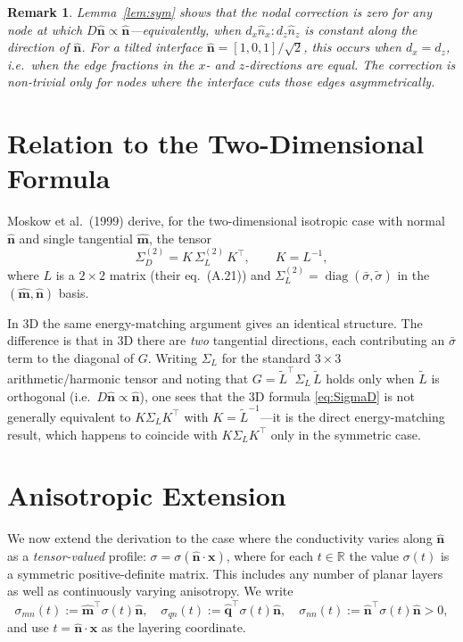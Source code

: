 \documentclass[11pt]{article}
\newtheorem{remark}{Remark}
\newcommand{\nn}{\hat{\bm{n}}}
\newcommand{\mm}{\hat{\bm{m}}}
\newcommand{\qq}{\hat{\bm{q}}}
\newcommand{\tL}{\widetilde{L}}
\newcommand{\SD}{\Sigma_D}
\newcommand{\SL}{\Sigma_L}
\newcommand{\sbar}{\bar{\sigma}}
\newcommand{\stilde}{\widetilde{\sigma}}
\begin{document}
\begin{remark}
Lemma~\ref{lem:sym} shows that the nodal correction is zero for any node at
which $D\nn\propto\nn$---equivalently, when $d_x\hat{n}_x : d_z\hat{n}_z$ is
constant along the direction of $\nn$.  For a tilted interface
$\nn=[1,0,1]/\sqrt{2}$, this occurs when $d_x = d_z$, i.e.\ when the edge
fractions in the $x$- and $z$-directions are equal.  The correction is
non-trivial only for nodes where the interface cuts those edges asymmetrically.
\end{remark}

\section{Relation to the Two-Dimensional Formula}

Moskow et al.\ (1999) derive, for the two-dimensional isotropic case with
normal $\nn$ and single tangential $\mm$, the tensor
\[
    \SD^{(2)} = K\,\SL^{(2)}\,K^\top,\qquad K = L^{-1},
\]
where $L$ is a $2\times2$ matrix (their eq.~(A.21)) and
$\SL^{(2)} = \operatorname{diag}(\sbar,\stilde)$ in the $(\mm,\nn)$ basis.

In 3D the same energy-matching argument gives an identical structure.  The
difference is that in 3D there are \emph{two} tangential directions, each
contributing an $\sbar$ term to the diagonal of $G$.  Writing $\SL$ for the
standard $3\times3$ arithmetic/harmonic tensor and noting that
$G = \tL^\top\SL\,\tL$ holds only when $\tL$ is orthogonal (i.e.\ $D\nn \propto
\nn$), one sees that the 3D formula \eqref{eq:SigmaD} is not generally equivalent
to $K\SL K^\top$ with $K=\tL^{-1}$---it is the direct energy-matching result,
which happens to coincide with $K\SL K^\top$ only in the symmetric case.

\section{Anisotropic Extension}\label{sec:anisotropic}

We now extend the derivation to the case where the conductivity varies along
$\nn$ as a \emph{tensor-valued} profile: $\sigma = \sigma(\nn\cdot\bm{x})$,
where for each $t\in\mathbb{R}$ the value $\sigma(t)$ is a symmetric
positive-definite matrix.  This includes any number of planar layers as well
as continuously varying anisotropy.  We write
\[
  \sigma_{mn}(t) := \mm^\top\!\sigma(t)\nn,
  \quad
  \sigma_{qn}(t) := \qq^\top\!\sigma(t)\nn,
  \quad
  \sigma_{nn}(t) := \nn^\top\!\sigma(t)\nn > 0,
\]
and use $t = \nn\cdot\bm{x}$ as the layering coordinate.
\end{document}
